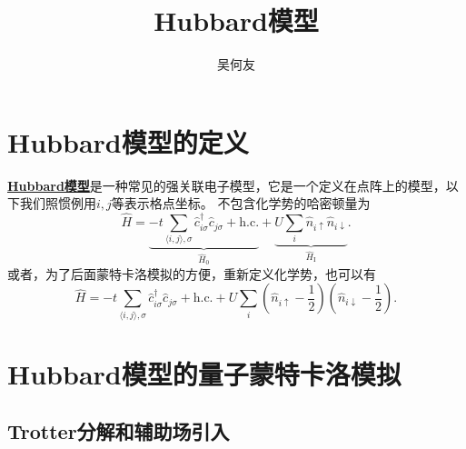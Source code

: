 \documentclass[hyperref, UTF8, a4paper]{ctexart}
\title{Hubbard模型}
\author{吴何友}
\newcommand*{\pair}[1]{\langle #1 \rangle}
\newcommand*{\concept}[1]{\underline{\textbf{#1}}}
\begin{document}
\maketitle

\section{Hubbard模型的定义}

\concept{Hubbard模型}是一种常见的强关联电子模型，它是一个定义在点阵上的模型，以下我们照惯例用$i, j$等表示格点坐标。
不包含化学势的哈密顿量为
\begin{equation}
    \hat{H} = \underbrace{-t \sum_{\pair{i, j}, \sigma} \hat{c}_{i\sigma}^\dagger \hat{c}_{j\sigma} + \text{h.c.}}_{\hat{H}_0} + \underbrace{U \sum_i \hat{n}_{i \uparrow} \hat{n}_{i \downarrow}}_{\hat{H}_\text{I}}.
\end{equation}
或者，为了后面蒙特卡洛模拟的方便，重新定义化学势，也可以有
\begin{equation}
    \hat{H} = -t \sum_{\pair{i, j}, \sigma} \hat{c}_{i\sigma}^\dagger \hat{c}_{j\sigma} + \text{h.c.} 
    + U \sum_i \left(\hat{n}_{i\uparrow} - \frac{1}{2}\right) \left(\hat{n}_{i\downarrow} - \frac{1}{2}\right).
\end{equation}

\section{Hubbard模型的量子蒙特卡洛模拟}

\subsection{Trotter分解和辅助场引入}
\end{document}
